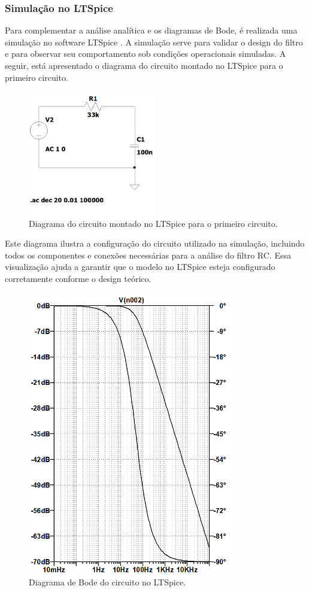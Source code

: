 \documentclass[
	12pt,				%
	openright,			%
	twoside,			%
	a4paper,			%
	english,			%
	french,				%
	spanish,			%
	brazil,				%
	]{abntex2}
\begin{document}
\subsubsection{Simulação no LTSpice}
Para complementar a análise analítica e os diagramas de Bode, é realizada uma simulação no software LTSpice \cite{ltspice}. A simulação serve para validar o design do filtro e para observar seu comportamento sob condições operacionais simuladas. A seguir, está apresentado o diagrama do circuito montado no LTSpice para o primeiro circuito.

\begin{figure}[H]
    \centering
    \includegraphics[width=0.5\textwidth]{imgs/first_circuit_ltspice_diagram.png}
    \caption{Diagrama do circuito montado no LTSpice para o primeiro circuito.}
    \label{fig:first_circuit_ltspice_diagram}
\end{figure}

Este diagrama ilustra a configuração do circuito utilizado na simulação, incluindo todos os componentes e conexões necessárias para a análise do filtro RC. Essa visualização ajuda a garantir que o modelo no LTSpice esteja configurado corretamente conforme o design teórico.

\begin{figure}[H]
    \centering
    \includegraphics[width=0.8\textwidth,height=0.45\textwidth]{imgs/first_circuit_ltspice_bode.png}
    \caption{Diagrama de Bode do circuito no LTSpice.}
    \label{fig:first_circuit_ltspice_bode}
\end{figure}
\end{document}

